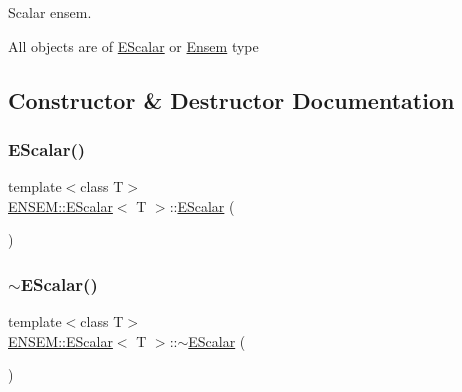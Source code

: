 Scalar ensem. 

All objects are of \mbox{\hyperlink{classENSEM_1_1EScalar}{E\+Scalar}} or \mbox{\hyperlink{classENSEM_1_1Ensem}{Ensem}} type 

\subsection{Constructor \& Destructor Documentation}
\mbox{\label{classENSEM_1_1EScalar_ad4290141b2f7d43b6652d8ef95dfdbf5}} 
\subsubsection{\texorpdfstring{EScalar()}{EScalar()}\hspace{0.1cm}{\footnotesize\ttfamily [1/18]}}
{\footnotesize\ttfamily template$<$class T$>$ \\
\mbox{\hyperlink{classENSEM_1_1EScalar}{E\+N\+S\+E\+M\+::\+E\+Scalar}}$<$ T $>$\+::\mbox{\hyperlink{classENSEM_1_1EScalar}{E\+Scalar}} (\begin{DoxyParamCaption}{ }\end{DoxyParamCaption})\hspace{0.3cm}{\ttfamily [inline]}}

\mbox{\label{classENSEM_1_1EScalar_addb090b46c2b6abdff79eb52bad58091}} 
\subsubsection{\texorpdfstring{$\sim$EScalar()}{~EScalar()}\hspace{0.1cm}{\footnotesize\ttfamily [1/3]}}
{\footnotesize\ttfamily template$<$class T$>$ \\
\mbox{\hyperlink{classENSEM_1_1EScalar}{E\+N\+S\+E\+M\+::\+E\+Scalar}}$<$ T $>$\+::$\sim$\mbox{\hyperlink{classENSEM_1_1EScalar}{E\+Scalar}} (\begin{DoxyParamCaption}{ }\end{DoxyParamCaption})\hspace{0.3cm}{\ttfamily [inline]}}

\mbox{\label{classENSEM_1_1EScalar_ad064adaa15e67106893182ba57c6fd91}} 

